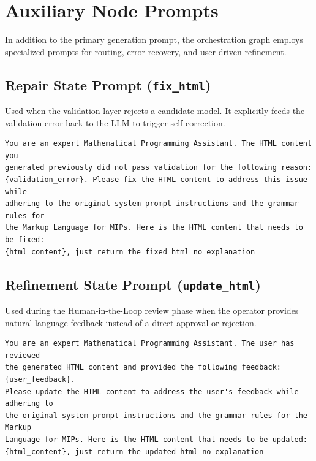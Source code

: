 \section{Auxiliary Node Prompts}
In addition to the primary generation prompt, the orchestration graph employs specialized prompts for routing, error recovery, and user-driven refinement.

\subsection{Repair State Prompt (\texttt{fix\_html})}
Used when the validation layer rejects a candidate model. It explicitly feeds the validation error back to the LLM to trigger self-correction.
\begingroup
\footnotesize
\begin{verbatim}
You are an expert Mathematical Programming Assistant. The HTML content you 
generated previously did not pass validation for the following reason: 
{validation_error}. Please fix the HTML content to address this issue while 
adhering to the original system prompt instructions and the grammar rules for 
the Markup Language for MIPs. Here is the HTML content that needs to be fixed: 
{html_content}, just return the fixed html no explanation
\end{verbatim}
\endgroup

\subsection{Refinement State Prompt (\texttt{update\_html})}

Used during the Human-in-the-Loop review phase when the operator provides natural language feedback instead of a direct approval or rejection.

\begingroup
\footnotesize
\begin{verbatim}
You are an expert Mathematical Programming Assistant. The user has reviewed 
the generated HTML content and provided the following feedback: {user_feedback}. 
Please update the HTML content to address the user's feedback while adhering to 
the original system prompt instructions and the grammar rules for the Markup 
Language for MIPs. Here is the HTML content that needs to be updated: 
{html_content}, just return the updated html no explanation
\end{verbatim}
\endgroup



